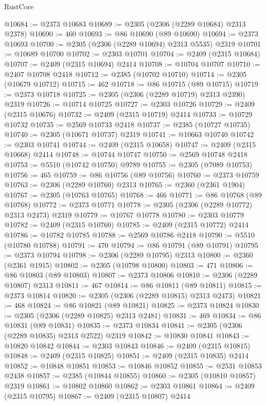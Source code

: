 \begin{lexlean}{RustCore}
\begin{coremodule}
@10684 := @2373 @10683
@10689 := @2305 (@2306 (@2289 @10684) @2313 @2378)
@10690 := 460
@10693 := @86 @10690 (@89 @10690)
@10694 := @2373 @10693
@10700 := @2305 (@2306 (@2289 @10694) @2313 @5535) @2319
@10701 := @10689 @10700
@10702 := @2303 @10701
@10704 := @2409 (@2315 @10684)
@10707 := @2409 (@2315 @10694) @2414
@10708 := @10704 @10707
@10710 := @2407 @10708 @2418
@10712 := @2385 (@10702 @10710)
@10714 := @2305 (@10679 @10712)
@10715 := 462
@10718 := @86 @10715 (@89 @10715)
@10719 := @2373 @10718
@10725 := @2305 (@2306 (@2289 @10719) @2313 @2390) @2319
@10726 := @10714 @10725
@10727 := @2303 @10726
@10729 := @2409 (@2315 @10676)
@10732 := @2409 (@2315 @10719) @2414
@10733 := @10729 @10732
@10735 := @2569 @10733 @2418
@10737 := @2385 (@10727 @10735)
@10740 := @2305 (@10671 @10737) @2319
@10741 := @10663 @10740
@10742 := @2303 @10741
@10744 := @2409 (@2315 @10658)
@10747 := @2409 (@2315 @10668) @2414
@10748 := @10744 @10747
@10750 := @2569 @10748 @2418
@10753 := @5510 (@10742 @10750) @9789
@10755 := @2305 (@7089 @10753)
@10756 := 465
@10759 := @86 @10756 (@89 @10756)
@10760 := @2373 @10759
@10763 := @2306 (@2289 @10760) @2313
@10765 := @2360 (@2361 @1904)
@10767 := @2305 (@10763 @10765)
@10768 := 466
@10771 := @86 @10768 (@89 @10768)
@10772 := @2373 @10771
@10778 := @2305 (@2306 (@2289 @10772) @2313 @2473) @2319
@10779 := @10767 @10778
@10780 := @2303 @10779
@10782 := @2409 (@2315 @10760)
@10785 := @2409 (@2315 @10772) @2414
@10786 := @10782 @10785
@10788 := @2569 @10786 @2418
@10790 := @5510 (@10780 @10788)
@10791 := 470
@10794 := @86 @10791 (@89 @10791)
@10795 := @2373 @10794
@10798 := @2306 (@2289 @10795) @2313
@10800 := @2360 (@2361 @1915)
@10802 := @2305 (@10798 @10800)
@10803 := 471
@10806 := @86 @10803 (@89 @10803)
@10807 := @2373 @10806
@10810 := @2306 (@2289 @10807) @2313
@10811 := 467
@10814 := @86 @10811 (@89 @10811)
@10815 := @2373 @10814
@10820 := @2305 (@2306 (@2289 @10815) @2313 @2473)
@10821 := 468
@10824 := @86 @10821 (@89 @10821)
@10825 := @2373 @10824
@10830 := @2305 (@2306 (@2289 @10825) @2313 @2481)
@10831 := 469
@10834 := @86 @10831 (@89 @10831)
@10835 := @2373 @10834
@10841 := @2305 (@2306 (@2289 @10835) @2313 @2522) @2319
@10842 := @10830 @10841
@10843 := @10820 @10842
@10844 := @2303 @10843
@10846 := @2409 (@2315 @10815)
@10848 := @2409 (@2315 @10825)
@10851 := @2409 (@2315 @10835) @2414
@10852 := @10848 @10851
@10853 := @10846 @10852
@10855 := @2531 @10853 @2438
@10857 := @2385 (@10844 @10855)
@10860 := @2305 (@10810 @10857) @2319
@10861 := @10802 @10860
@10862 := @2303 @10861
@10864 := @2409 (@2315 @10795)
@10867 := @2409 (@2315 @10807) @2414

\end{coremodule}
\end{lexlean}
